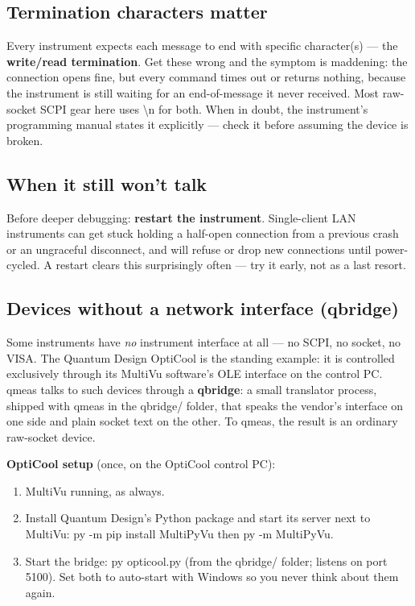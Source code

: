 \documentclass[11pt,a4paper]{article}
\newcommand{\code}[1]{{\ttfamily\color{qcode}#1}}
\begin{document}
\subsection{Termination characters matter}

Every instrument expects each message to end with specific character(s) ---
the \textbf{write/read termination}. Get these wrong and the symptom is
maddening: the connection opens fine, but every command times out or returns
nothing, because the instrument is still waiting for an end-of-message it
never received. Most raw-socket SCPI gear here uses \code{\textbackslash n}
for both. When in doubt, the instrument's programming manual states it
explicitly --- check it before assuming the device is broken.

\subsection{When it still won't talk}

\begin{tip}
Before deeper debugging: \textbf{restart the instrument}. Single-client LAN
instruments can get stuck holding a half-open connection from a previous
crash or an ungraceful disconnect, and will refuse or drop new connections
until power-cycled. A restart clears this surprisingly often --- try it early,
not as a last resort.
\end{tip}

\subsection{Devices without a network interface (qbridge)}
\label{sec:qbridge}

Some instruments have \emph{no} instrument interface at all --- no SCPI, no
socket, no VISA. The Quantum Design OptiCool is the standing example: it is
controlled exclusively through its MultiVu software's OLE interface on the
control PC. qmeas talks to such devices through a \textbf{qbridge}: a small
translator process, shipped with qmeas in the \code{qbridge/} folder, that
speaks the vendor's interface on one side and plain socket text on the other.
To qmeas, the result is an ordinary raw-socket device.

\textbf{OptiCool setup} (once, on the OptiCool control PC):

\begin{enumerate}
  \item MultiVu running, as always.
  \item Install Quantum Design's Python package and start its server next to
  MultiVu: \code{py -m pip install MultiPyVu} then \code{py -m MultiPyVu}.
  \item Start the bridge: \code{py opticool.py} (from the \code{qbridge/}
  folder; listens on port 5100). Set both to auto-start with Windows so you
  never think about them again.
\end{enumerate}
\end{document}
